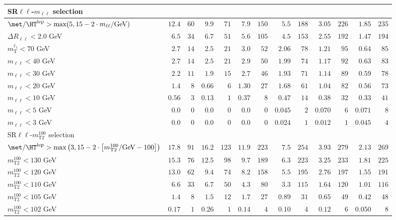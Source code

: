 \begin{table}
\begin{center}
\begin{tabular*}{\textwidth}{@{\extracolsep{\fill}}lrrrrrrrrrrrr}
\midrule
SR$\ell\ell$-$m_{\ell\ell}$ selection &  &  &  &  &  & \\ 
\midrule
$\met / \HT^\text{lep} > \text{max}(5, 15-2\cdot m_{\ell\ell}/\text{GeV})$ & $12.4$ & $60$    & $9.9$ & $71$    & $7.9$ & $150$    & $5.5$ & $188$    & $3.05$ & $226$    & $1.85$ & $235$   \\ 
    $\Delta R_{\ell\ell} < 2.0$ GeV & $6.5$ & $34$    & $6.7$ & $51$    & $5.6$ & $105$    & $4.5$ & $153$    & $2.55$ & $192$    & $1.47$ & $194$   \\ 
    $m_\text{T}^{\ell_1} < 70$ GeV & $2.7$ & $14$    & $2.5$ & $21$    & $3.0$ & $52$    & $2.06$ & $78$    & $1.21$ & $95$    & $0.64$ & $85$   \\ 
    $m_{\ell\ell} < 40$ GeV & $2.7$ & $14$    & $2.5$ & $21$    & $2.9$ & $50$    & $1.99$ & $74$    & $1.17$ & $92$    & $0.63$ & $83$   \\ 
    $m_{\ell\ell} < 30$ GeV & $2.2$ & $11$    & $1.9$ & $15$    & $2.7$ & $46$    & $1.93$ & $71$    & $1.14$ & $89$    & $0.59$ & $78$   \\ 
    $m_{\ell\ell} < 20$ GeV & $1.4$ & $8$    & $0.66$ & $6$    & $1.30$ & $27$    & $1.68$ & $61$    & $1.04$ & $82$    & $0.56$ & $73$   \\ 
    $m_{\ell\ell} < 10$ GeV & $0.56$ & $3$    & $0.13$ & $1$    & $0.37$ & $8$    & $0.47$ & $14$    & $0.38$ & $32$    & $0.33$ & $41$   \\ 
    $m_{\ell\ell} < 5$ GeV & $0.0$ & $0$    & $0.0$ & $0$    & $0.0$ & $0$    & $0.045$ & $2$    & $0.070$ & $6$    & $0.071$ & $8$   \\ 
    $m_{\ell\ell} < 3$ GeV & $0.0$ & $0$    & $0.0$ & $0$    & $0.0$ & $0$    & $0.024$ & $1$    & $0.012$ & $1$    & $0.045$ & $4$   \\ 
    \midrule
SR$\ell\ell$-$m_\text{T2}^{100}$ selection &  &  &  &  &  & \\ 
\midrule
$\met / \HT^\text{lep} > \text{max}\left(3, 15-2\cdot \left[m_\text{T2}^{100}/\text{GeV} - 100\right]\right)$ & $17.8$ & $91$    & $16.2$ & $123$    & $11.9$ & $223$    & $7.5$ & $254$    & $3.93$ & $279$    & $2.13$ & $269$   \\ 
    $m_\text{T2}^{100} < 130$ GeV & $15.3$ & $76$    & $12.5$ & $98$    & $9.7$ & $189$    & $6.3$ & $223$    & $3.25$ & $233$    & $1.81$ & $225$   \\ 
    $m_\text{T2}^{100} < 120$ GeV & $13.0$ & $62$    & $9.4$ & $74$    & $8.2$ & $158$    & $5.5$ & $195$    & $2.76$ & $197$    & $1.55$ & $191$   \\ 
    $m_\text{T2}^{100} < 110$ GeV & $6.6$ & $33$    & $6.7$ & $50$    & $4.3$ & $80$    & $3.3$ & $115$    & $1.64$ & $120$    & $1.01$ & $116$   \\ 
    $m_\text{T2}^{100} < 105$ GeV & $1.4$ & $8$    & $1.5$ & $12$    & $1.7$ & $27$    & $0.89$ & $31$    & $0.65$ & $49$    & $0.42$ & $48$   \\ 
    $m_\text{T2}^{100} < 102$ GeV & $0.17$ & $1$    & $0.26$ & $1$    & $0.14$ & $4$    & $0.10$ & $4$    & $0.12$ & $6$    & $0.050$ & $8$   \\ 
    

\end{tabular*}
\end{center}
\end{table}
